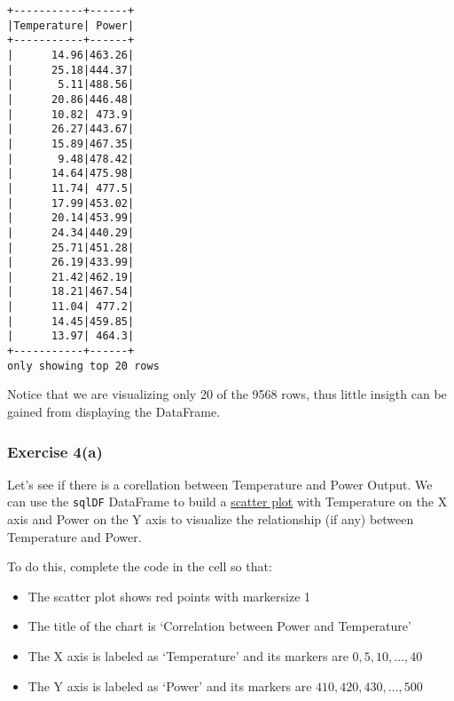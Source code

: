 \documentclass[11pt]{article}
\providecommand{\tightlist}{%
      \setlength{\itemsep}{0pt}\setlength{\parskip}{0pt}}
\begin{document}
    \begin{Verbatim}[commandchars=\\\{\}]
+-----------+------+
|Temperature| Power|
+-----------+------+
|      14.96|463.26|
|      25.18|444.37|
|       5.11|488.56|
|      20.86|446.48|
|      10.82| 473.9|
|      26.27|443.67|
|      15.89|467.35|
|       9.48|478.42|
|      14.64|475.98|
|      11.74| 477.5|
|      17.99|453.02|
|      20.14|453.99|
|      24.34|440.29|
|      25.71|451.28|
|      26.19|433.99|
|      21.42|462.19|
|      18.21|467.54|
|      11.04| 477.2|
|      14.45|459.85|
|      13.97| 464.3|
+-----------+------+
only showing top 20 rows
    \end{Verbatim}

    Notice that we are visualizing only 20 of the 9568 rows, thus little
insigth can be gained from displaying the DataFrame.

    \hypertarget{exercise-4a}{%
\subsubsection{Exercise 4(a)}\label{exercise-4a}}

Let's see if there is a corellation between Temperature and Power
Output. We can use the \texttt{sqlDF} DataFrame to build a
\href{https://matplotlib.org/3.1.1/api/_as_gen/matplotlib.pyplot.scatter.html}{scatter
plot} with Temperature on the X axis and Power on the Y axis to
visualize the relationship (if any) between Temperature and Power.

To do this, complete the code in the cell so that:

\begin{itemize}
\tightlist
\item
  The scatter plot shows red points with markersize 1
\item
  The title of the chart is `Correlation between Power and Temperature'
\item
  The X axis is labeled as `Temperature' and its markers are
  \(0, 5, 10, \ldots, 40\)
\item
  The Y axis is labeled as `Power' and its markers are
  \(410, 420, 430, \ldots, 500\)
\end{itemize}
\end{document}
